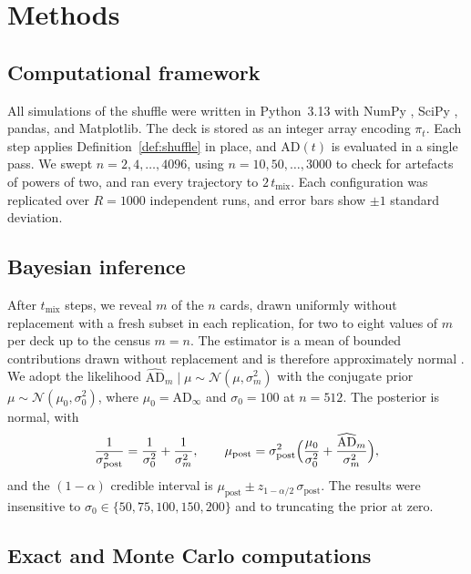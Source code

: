\documentclass[ba]{imsart}
\theoremstyle{plain}
\theoremstyle{definition}
\newcommand{\AD}{\mathrm{AD}}
\newcommand{\ADh}{\widehat{\mathrm{AD}}}
\begin{document}
\section{Methods}\label{sec:methods}

\subsection{Computational framework}

All simulations of the shuffle were written in Python~3.13 with NumPy \citep{Harris2020}, SciPy \citep{Virtanen2020}, pandas, and Matplotlib. The deck is stored as an integer array encoding $\pi_t$. Each step applies Definition~\ref{def:shuffle} in place, and $\AD(t)$ is evaluated in a single pass. We swept $n=2,4,\dots,4096$, using $n=10,50,\dots,3000$ to check for artefacts of powers of two, and ran every trajectory to $2\,t_{\mathrm{mix}}$. Each configuration was replicated over $R=1000$ independent runs, and error bars show $\pm1$ standard deviation.

\subsection{Bayesian inference}\label{sec:bayes-methods}

After $t_{\mathrm{mix}}$ steps, we reveal $m$ of the $n$ cards, drawn uniformly without replacement with a fresh subset in each replication, for two to eight values of $m$ per deck up to the census $m=n$. The estimator is a mean of bounded contributions drawn without replacement and is therefore approximately normal \citep{Hajek1960}. We adopt the likelihood $\ADh_m\mid\mu\sim\mathcal N(\mu,\sigma_m^2)$ with the conjugate prior $\mu\sim\mathcal N(\mu_0,\sigma_0^2)$, where $\mu_0=\AD_\infty$ and $\sigma_0=100$ at $n=512$. The posterior is normal, with
\begin{equation}\label{eq:posterior}
\frac{1}{\sigma_{\mathrm{post}}^2}=\frac{1}{\sigma_0^2}+\frac{1}{\sigma_m^2},\qquad
\mu_{\mathrm{post}}=\sigma_{\mathrm{post}}^2\Bigl(\frac{\mu_0}{\sigma_0^2}+\frac{\ADh_m}{\sigma_m^2}\Bigr),
\end{equation}
and the $(1-\alpha)$ credible interval is $\mu_{\mathrm{post}}\pm z_{1-\alpha/2}\,\sigma_{\mathrm{post}}$. The results were insensitive to $\sigma_0\in\{50,75,100,150,200\}$ and to truncating the prior at zero.

\subsection{Exact and Monte Carlo computations}
\end{document}
